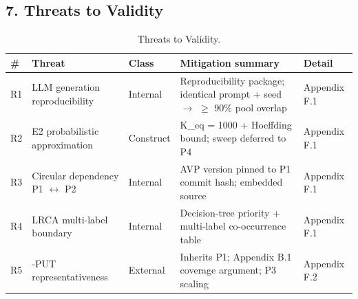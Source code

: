 \documentclass[review,12pt,authoryear]{elsarticle}
\begin{document}

\subsection{7. Threats to Validity}\label{threats-to-validity}

{\def\LTcaptype{table} %
\begin{longtable}[]{@{}
  >{\raggedright\arraybackslash}p{}
  >{\raggedright\arraybackslash}p{}
  >{\raggedright\arraybackslash}p{}
  >{\raggedright\arraybackslash}p{}
  >{\raggedright\arraybackslash}p{}@{}}
\caption{Threats to Validity.}\label{tab:p2-14}\\
\toprule\noalign{}
\begin{minipage}[b]{\linewidth}\raggedright
\#
\end{minipage} & \begin{minipage}[b]{\linewidth}\raggedright
Threat
\end{minipage} & \begin{minipage}[b]{\linewidth}\raggedright
Class
\end{minipage} & \begin{minipage}[b]{\linewidth}\raggedright
Mitigation summary
\end{minipage} & \begin{minipage}[b]{\linewidth}\raggedright
Detail
\end{minipage} \\
\midrule\noalign{}
\endhead
\bottomrule\noalign{}
\endlastfoot
R1 & LLM generation reproducibility & Internal & Reproducibility
package; identical prompt + seed $\to$ $\geq$ 90\% pool overlap & Appendix F.1 \\
R2 & E2 probabilistic approximation & Construct & K\_eq = 1000 +
Hoeffding bound; sweep deferred to P4 & Appendix F.1 \\
R3 & Circular dependency P1 $\leftrightarrow$ P2 & Internal & AVP version pinned to P1
commit hash; embedded source & Appendix F.1 \\
R4 & LRCA multi-label boundary & Internal & Decision-tree priority +
multi-label co-occurrence table & Appendix F.1 \\
R5 & 12-PUT representativeness & External & Inherits P1; Appendix B.1
coverage argument; P3 scaling & Appendix F.2 \\

\end{longtable}}
\end{document}
